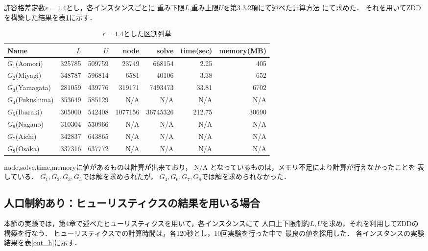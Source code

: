 許容格差定数$r=1.4$とし，各インスタンスごとに
重み下限$L$,重み上限$U$を第3.3.2項にて述べた計算方法
にて求めた．
それを用いてZDDを構築した結果を表\ref{out_r}に示す．

\begin{table}[htbp]
  \caption{$r=1.4$とした区割列挙}
  \label{out_r}
  \centering
  \begin{tabular}{l||r|r||r|r|r|r}
    \hline
    Name & $L$ & $U$ & node & solve & time(sec) & memory(MB) \\
    \hline \hline
    $G_1$(Aomori) & 325785 & 509759 & 23749 & 668154 & 2.25 & 405 \\
    $G_2$(Miyagi) & 348787 & 596814 & 6581 & 40106 & 3.38 & 652 \\
    $G_3$(Yamagata) & 281059 & 439776 & 319171 & 7493473 & 33.81 & 6702 \\
    $G_4$(Fukushima) & 353649 & 585129 & N/A & N/A & N/A & N/A \\
    $G_5$(Ibaraki) & 305000 & 542408 & 1077156 & 36745326 & 212.75 & 30690 \\
    $G_6$(Nagano) & 310304 & 530966 & N/A & N/A & N/A & N/A \\
    $G_7$(Aichi) & 342837 & 643865 & N/A & N/A & N/A & N/A \\
    $G_8$(Osaka) & 337316 & 637772 & N/A & N/A & N/A & N/A \\
    \hline
  \end{tabular}
\end{table}

node,solve,time,memoryに値があるものは計算が出来ており，
N/A となっているものは，メモリ不足により計算が行えなかったことを
表している．
$G_1, G_2, G_3, G_5$では解を求められたが，
$G_4, G_6, G_7, G_8$では解を求められなかった．

\subsection{人口制約あり：ヒューリスティクスの結果を用いる場合}

本節の実験では，第4章で述べたヒューリスティクスを用いて，各インスタンスにて
人口上下限制約$L, U$を求め，それを利用してZDDの構築を行なう．
ヒューリスティクスでの計算時間は，各120秒とし，10回実験を行った中で
最良の値を採用した．
各インスタンスの実験結果を表\ref{out_h}に示す．

